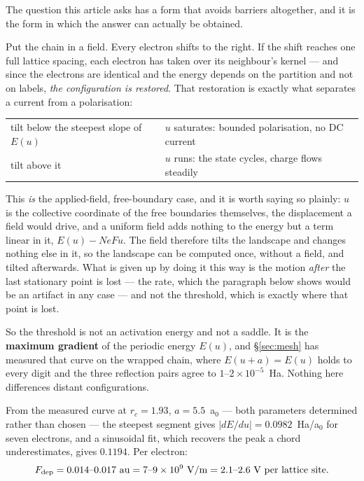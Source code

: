 \documentclass[11pt]{article}
\begin{document}
The question this article asks has a form that avoids barriers altogether, and it is the form in
which the answer can actually be obtained.

Put the chain in a field. Every electron shifts to the right. If the shift reaches one full lattice
spacing, each electron has taken over its neighbour's kernel --- and since the electrons are
identical and the energy depends on the partition and not on labels, \emph{the configuration is
restored}. That restoration is exactly what separates a current from a polarisation:
\begin{center}
\small
\begin{tabular}{@{}ll@{}}
\toprule
tilt below the steepest slope of $E(u)$ & $u$ saturates: bounded polarisation, no DC current\\
tilt above it & $u$ runs: the state cycles, charge flows steadily\\
\bottomrule
\end{tabular}
\end{center}

\noindent This \emph{is} the applied-field, free-boundary case, and it is worth saying so plainly:
$u$ is the collective coordinate of the free boundaries themselves, the displacement a field would
drive, and a uniform field adds nothing to the energy but a term linear in it, $E(u)-NeFu$. The
field therefore tilts the landscape and changes nothing else in it, so the landscape can be computed
once, without a field, and tilted afterwards. What is given up by doing it this way is the motion
\emph{after} the last stationary point is lost --- the rate, which the paragraph below shows would
be an artifact in any case --- and not the threshold, which is exactly where that point is lost.

So the threshold is not an activation energy and not a saddle. It is the \textbf{maximum
gradient} of the periodic energy $E(u)$, and \S\ref{sec:mesh} has measured that curve on the wrapped
chain, where $E(u{+}a)=E(u)$ holds to every digit and the three reflection pairs agree to
$1$--$2\times10^{-5}$~Ha. Nothing here differences distant configurations.

From the measured curve at $r_c=1.93$, $a=5.5$~a$_0$ --- both parameters determined rather than
chosen --- the steepest segment gives $|dE/du|=0.0982$~Ha/a$_0$ for seven electrons, and a
sinusoidal fit, which recovers the peak a chord underestimates, gives $0.1194$. Per electron:
\begin{equation}\label{eq:Fdep}
F_{\rm dep}=0.014\text{--}0.017~\text{au}
 =7\text{--}9\times10^{9}~\mathrm{V/m}
 =2.1\text{--}2.6~\mathrm{V\ per\ lattice\ site}.
\end{equation}
\end{document}
